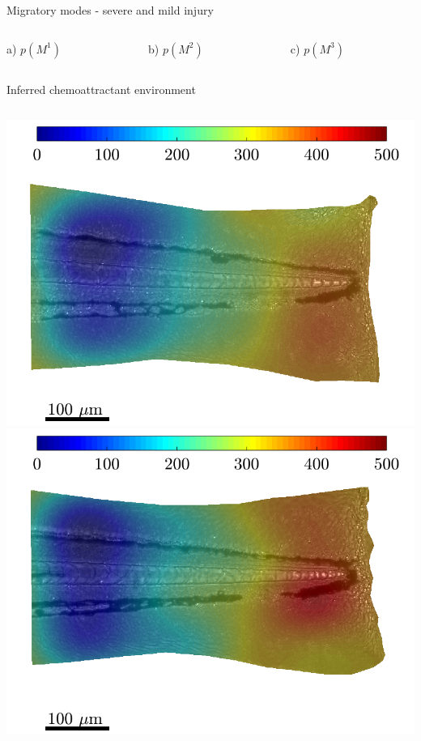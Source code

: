 \documentclass[mathserif,11pt]{beamer}
\begin{document}
\begin{frame}{Migratory modes - severe and mild injury}
\begin{columns}
\begin{column}{0.31\textwidth}
	\end{column}
\end{columns}
\begin{columns}
\centering
\begin{column}{0.31\textwidth}
	\centering
	\footnotesize{ a) $p(M^1)$}
\end{column}
\begin{column}{0.31\textwidth}
	\centering
	\footnotesize{ b)  $p(M^2)$}
\end{column}
\begin{column}{0.31\textwidth}
	\centering
	\footnotesize{ c)  $p(M^3)$}
\end{column}
\end{columns}
\end{frame}
\begin{frame}{Inferred chemoattractant environment}
\begin{columns}
	\begin{column}{0.3\textwidth}
		\includegraphics[scale=0.19]{Figures/field_fish1.png}
		\vspace{0.4cm}
		\includegraphics[scale=0.19]{Figures/field_fish3.png}

\end{column}
\end{columns}
\end{frame}
\end{document}
